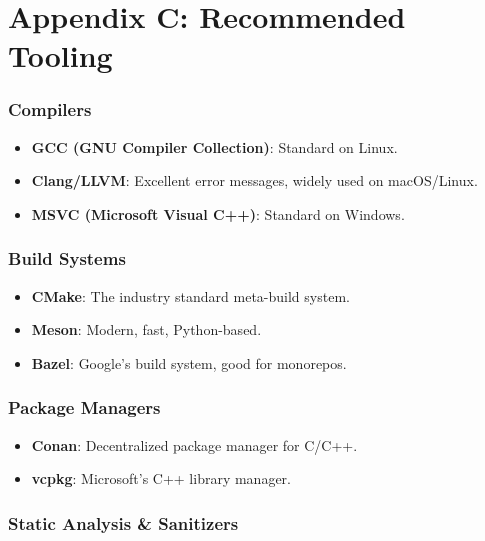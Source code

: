 \hypertarget{appendix-c-recommended-tooling}{%
\section{Appendix C: Recommended
Tooling}\label{appendix-c-recommended-tooling}}

\hypertarget{compilers}{%
\subsubsection{Compilers}\label{compilers}}

\begin{itemize}
\tightlist
\item
  \textbf{GCC (GNU Compiler Collection)}: Standard on Linux.
\item
  \textbf{Clang/LLVM}: Excellent error messages, widely used on
  macOS/Linux.
\item
  \textbf{MSVC (Microsoft Visual C++)}: Standard on Windows.
\end{itemize}

\hypertarget{build-systems}{%
\subsubsection{Build Systems}\label{build-systems}}

\begin{itemize}
\tightlist
\item
  \textbf{CMake}: The industry standard meta-build system.
\item
  \textbf{Meson}: Modern, fast, Python-based.
\item
  \textbf{Bazel}: Google's build system, good for monorepos.
\end{itemize}

\hypertarget{package-managers}{%
\subsubsection{Package Managers}\label{package-managers}}

\begin{itemize}
\tightlist
\item
  \textbf{Conan}: Decentralized package manager for C/C++.
\item
  \textbf{vcpkg}: Microsoft's C++ library manager.
\end{itemize}

\hypertarget{static-analysis-sanitizers}{%
\subsubsection{Static Analysis \&
Sanitizers}\label{static-analysis-sanitizers}}

